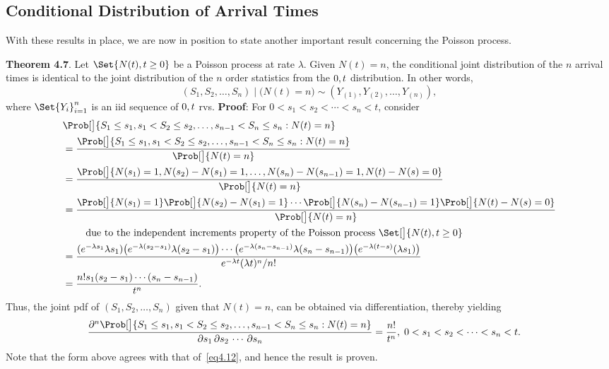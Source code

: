 \subsection*{Conditional Distribution of Arrival Times}
With these results in place, we are now in position to state another important result
concerning the Poisson process.
\begin{Result}
    \textbf{Theorem 4.7}. Let $ \Set{N(t),t\ge 0} $ be a Poisson process at rate $ \lambda $. Given $ N(t)=n $,
    the conditional joint distribution of the $ n $ arrival times is identical to the joint distribution of the $ n $ order statistics
    from the $ \relax{0,t} $ distribution. In other words,
    \[ (S_1,S_2,\ldots,S_n)\mid \bigl(N(t)=n\bigr)\sim (Y_{(1)},Y_{(2)},\ldots,Y_{(n)}), \]
    where $ \Set{Y_i}_{i=1}^n $ is an iid sequence of $ \relax{0,t} $ rvs.
    \tcblower{}
    \textbf{Proof}: For $ 0<s_1<s_2<\cdots<s_n<t $, consider
    \begin{align*}
         & \Prob[\big]{S_1\le s_1,s_1<S_2\le s_2,\ldots,s_{n-1}< S_n\le s_n\given N(t)=n}                                           \\
         & =\frac{\Prob[\big]{S_1\le s_1,s_1<S_2\le s_2,\ldots,s_{n-1}< S_n\le s_n\given N(t)=n}}{\Prob[\big]{N(t)=n}}              \\
         & =\frac{\Prob[\big]{N(s_1)=1,N(s_2)-N(s_1)=1,\ldots,N(s_n)-N(s_{n-1})=1,N(t)-N(s)=0}}{\Prob[\big]{N(t)=n}}                \\
         & =\frac{\Prob[\big]{N(s_1)=1}
            \Prob[\big]{N(s_2)-N(s_1)=1}\cdots
            \Prob[\big]{N(s_n)-N(s_{n-1})=1}
        \Prob[\big]{N(t)-N(s)=0}}{\Prob[\big]{N(t)=n}}                                                                              \\
         & \phantom{{}={}}\quad\text{due to the independent increments property of the Poisson process $ \Set[\big]{N(t),t\ge 0} $} \\
         & =\frac{(e^{-\lambda s_1}\lambda s_1)
            \bigl(e^{-\lambda (s_2-s_{1})}\lambda (s_2-s_{1})\bigr)\cdots
            \bigl(e^{-\lambda (s_n-s_{n-1})}\lambda (s_n-s_{n-1})\bigr)
        \bigl(e^{-\lambda (t-s)}(\lambda s_1)\bigr)}{e^{-\lambda t}(\lambda t)^n/n!}                                                \\
         & =\frac{n!s_1(s_2-s_1)\cdots(s_{n}-s_{n-1})}{t^n}.
    \end{align*}
    Thus, the joint pdf of $ (S_1,S_2,\ldots,S_n) $ given that $ N(t)=n $, can
    be obtained via differentiation, thereby yielding
    \begin{align*}
        \frac{\partial^n
        \Prob[\big]{S_1\le s_1,s_1<S_2\le s_2,\ldots,s_{n-1}< S_n\le s_n\given N(t)=n}}{\partial s_1\,\partial s_2\,\cdots\,\partial s_n}
         & =\frac{n!}{t^n},\; 0<s_1<s_2<\cdots<s_n<t.
    \end{align*}
    Note that the form above agrees with that of~\ref{eq4.12}, and hence
    the result is proven.
\end{Result}

